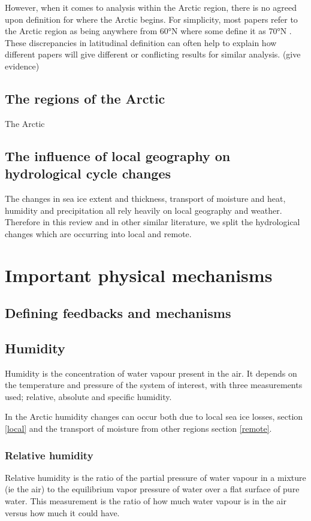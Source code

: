 \documentclass[12pt, oneside]{article}
\begin{document}
However, when it comes to analysis within the Arctic region, there is no agreed upon definition for where the Arctic begins. For simplicity, most papers refer to the Arctic region as being anywhere from 60°N where some define it as 70°N \cite{Ghatak2013, serreze2012recent}. These discrepancies in latitudinal definition can often help to explain how different papers will give different or conflicting results for similar analysis. (give evidence)
\subsection{The regions of the Arctic}
The Arctic 
\subsection{The influence of local geography on hydrological cycle changes}
The changes in sea ice extent and thickness, transport of moisture and heat, humidity and precipitation all rely heavily on local geography and weather. Therefore in this review and in other similar literature, we split the hydrological changes which are occurring into local and remote.




\section{Important physical mechanisms}

\subsection{Defining feedbacks and mechanisms}
\subsection{Humidity}\label{humidity}

Humidity is the concentration of water vapour present in the air. It depends on the temperature and pressure of the system of interest, with three measurements used; relative, absolute and specific humidity. 

In the Arctic humidity changes can occur both due to local sea ice losses, section \ref{local} and the transport of moisture from other regions section \ref{remote}. 



\subsubsection{Relative humidity}
Relative humidity is the ratio of the partial pressure of water vapour in a mixture (ie the air) to the equilibrium vapor pressure of water over a flat surface of pure water. This measurement is the ratio of how much water vapour is in the air versus how much it could have. 
\end{document}

